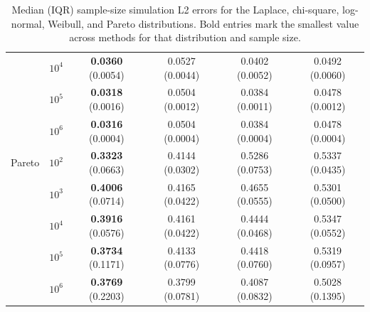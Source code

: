 \begin{table}[p]
{\begin{tabular}{llcccc}
 & $10^4$ & \textbf{0.0360} (0.0054) & 0.0527 (0.0044) & 0.0402 (0.0052) & 0.0492 (0.0060) \\
 & $10^5$ & \textbf{0.0318} (0.0016) & 0.0504 (0.0012) & 0.0384 (0.0011) & 0.0478 (0.0012) \\
 & $10^6$ & \textbf{0.0316} (0.0004) & 0.0504 (0.0004) & 0.0384 (0.0004) & 0.0478 (0.0004) \\[0.6ex]
\midrule
Pareto & $10^2$ & \textbf{0.3323} (0.0663) & 0.4144 (0.0302) & 0.5286 (0.0753) & 0.5337 (0.0435) \\
 & $10^3$ & \textbf{0.4006} (0.0714) & 0.4165 (0.0422) & 0.4655 (0.0555) & 0.5301 (0.0500) \\
 & $10^4$ & \textbf{0.3916} (0.0576) & 0.4161 (0.0422) & 0.4444 (0.0468) & 0.5347 (0.0552) \\
 & $10^5$ & \textbf{0.3734} (0.1171) & 0.4133 (0.0776) & 0.4418 (0.0760) & 0.5319 (0.0957) \\
 & $10^6$ & \textbf{0.3769} (0.2203) & 0.3799 (0.0781) & 0.4087 (0.0832) & 0.5028 (0.1395) \\[0.6ex]
\bottomrule
\end{tabular}%
}
\caption{Median (IQR) sample-size simulation L2 errors for the Laplace, chi-square, log-normal, Weibull, and Pareto distributions. Bold entries mark the smallest value across methods for that distribution and sample size.}
\label{tab:l2_sample_size_group2_median}
\end{table}

